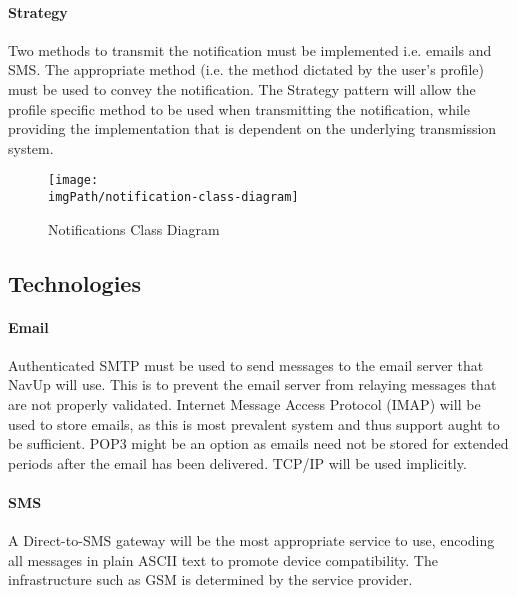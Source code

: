\paragraph{Strategy}
Two methods to transmit the notification must be implemented i.e. emails and SMS. The appropriate method (i.e. the method dictated by the user's profile) must be used to convey the notification. The Strategy pattern will allow the profile specific method to be used when transmitting the notification, while providing the implementation that is dependent on the underlying transmission system.


\begin{figure}[H]
\centering
\texttt{[image: \\imgPath/notification-class-diagram]}
\caption{Notifications Class Diagram}
\end{figure}



\subsection{Technologies}

\paragraph{Email}
Authenticated SMTP must be used to send messages to the email server that NavUp will use. This is to prevent the email server from relaying messages that are not properly validated. Internet Message Access Protocol (IMAP) will be used to store emails, as this is most prevalent system and thus support aught to be sufficient. POP3 might be an option as emails need not be stored for extended periods after the email has been delivered. TCP/IP will be used implicitly.

\paragraph{SMS}
A Direct-to-SMS gateway will be the most appropriate service to use, encoding all messages in plain ASCII text to promote device compatibility. The infrastructure such as GSM is determined by the service provider.